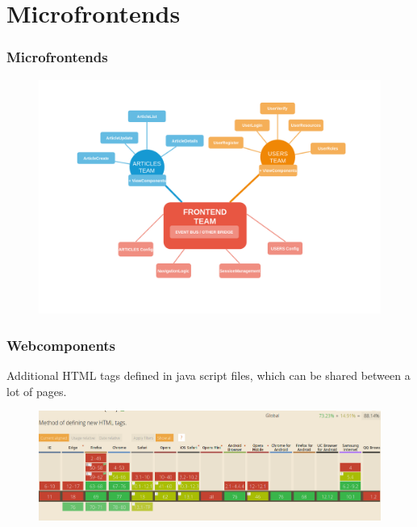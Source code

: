 \section{Microfrontends}

\begin{frame}
\frametitle{Microfrontends}
	\begin{figure}
		\centering
		\includegraphics[width=0.9\linewidth]{pictures/microfrontends-knowledge.png}		
		\label{fig:microservices}
	\end{figure}
\end{frame}

\begin{frame}
\frametitle{Webcomponents}
Additional HTML tags defined in java script files, which can be shared between a lot of pages.
\begin{figure}
	\centering
	\includegraphics[width=1\linewidth]{pictures/webcomponents-support.png}		
	\label{fig:microservices}
\end{figure}
\end{frame}

